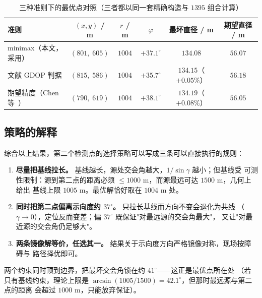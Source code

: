 \begin{table}[H]
  \centering
  \caption{三种准则下的最优点对照（三者都以同一套精确构造与 $1395$ 组合计算）}
  \label{tab:three}
  \small
  \setlength{\tabcolsep}{4pt}
  \begin{tabular}{lccccc}
    \toprule
    \textbf{准则} & $(x,y)$ / m & $r$ / m & $\varphi$ & \textbf{最坏直径 / m} & \textbf{期望直径 / m} \\
    \midrule
    minimax（本文，采用）           & $(801,\;605)$ & $1004$ & $+37.1^\circ$ & $\mathbf{134.08}$ & $56.07$ \\
    文献 GDOP 判据               & $(815,\;586)$ & $1004$ & $+35.7^\circ$ & $134.15$（$+0.05\%$） & $56.18$ \\
    期望精度（Chen 等~\cite{chen2009}）& $(790,\;619)$ & $1004$ & $+38.1^\circ$ & $134.19$（$+0.08\%$） & $\mathbf{56.05}$ \\
    \bottomrule
  \end{tabular}
\end{table}

\subsection{策略的解释}

综合以上结果，第二个检测点的选择策略可以写成三条可以直接执行的规则：

\begin{enumerate}
  \item \textbf{尽量把基线拉长。} 基线越长，源处交会角越大，$1/\sin\gamma$ 越小；但基线受
        可测性限制：源到第二点的距离必须 $\le1000$ m，而源最远可达 $1500$ m，几何上给出
        基线上限 $1005$ m。最优解恰好取在 $1004$ m 处。
  \item \textbf{同时把第二点偏离示向度约 $37^\circ$。} 只拉长基线而方向不变会退化为共线
        （$\gamma\to0$），定位反而变差；偏 $37^\circ$ 既保证"对最远源的交会角最大"，
        又让"对最近源的交会角仍足够大"。
  \item \textbf{两条镜像解等价，任选其一。} 结果关于示向度方向严格镜像对称，现场按障碍与
        路径择优即可。
\end{enumerate}

两个约束同时顶到边界，把最坏交会角锁在约 $41^\circ$——这正是最优点所在处
（若只有基线约束，理论上限是 $\arcsin(1005/1500)=42.1^\circ$，但那时最远源与第二点的距离
会超过 $1000$ m，只能放弃保证）。
